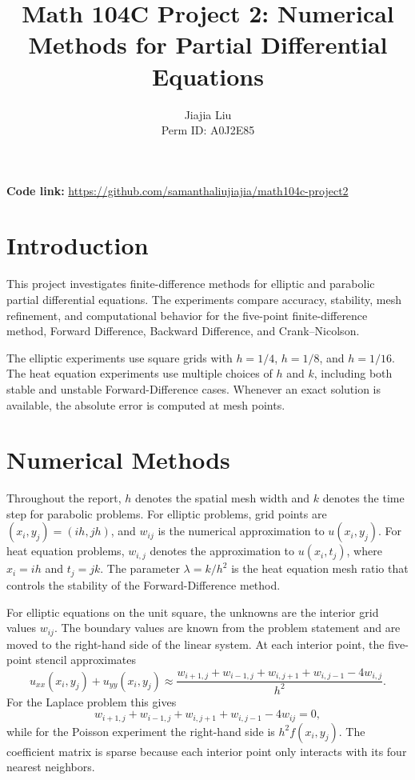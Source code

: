 \documentclass[11pt]{article}
\title{Math 104C Project 2: Numerical Methods for Partial Differential Equations}
\author{Jiajia Liu \\ Perm ID: A0J2E85}
\date{}
\begin{document}
\maketitle

\textbf{Code link:} \href{https://github.com/samanthaliujiajia/math104c-project2}{https://github.com/samanthaliujiajia/math104c-project2}

\section{Introduction}

This project investigates finite-difference methods for elliptic and parabolic
partial differential equations. The experiments compare accuracy, stability,
mesh refinement, and computational behavior for the five-point finite-difference
method, Forward Difference, Backward Difference, and Crank--Nicolson.

The elliptic experiments use square grids with \(h=1/4\), \(h=1/8\), and
\(h=1/16\). The heat equation experiments use multiple choices of \(h\) and
\(k\), including both stable and unstable Forward-Difference cases. Whenever an
exact solution is available, the absolute error is computed at mesh points.

\section{Numerical Methods}

Throughout the report, \(h\) denotes the spatial mesh width and \(k\) denotes
the time step for parabolic problems. For elliptic problems, grid points are
\((x_i,y_j)=(ih,jh)\), and \(w_{ij}\) is the numerical approximation to
\(u(x_i,y_j)\). For heat equation problems, \(w_{i,j}\) denotes the
approximation to \(u(x_i,t_j)\), where \(x_i=ih\) and \(t_j=jk\). The parameter
\(\lambda=k/h^2\) is the heat equation mesh ratio that controls the stability
of the Forward-Difference method.

For elliptic equations on the unit square, the unknowns are the interior grid
values \(w_{ij}\). The boundary values are known from the problem statement and
are moved to the right-hand side of the linear system. At each interior point,
the five-point stencil approximates
\[
  u_{xx}(x_i,y_j)+u_{yy}(x_i,y_j)
  \approx
  \frac{w_{i+1,j}+w_{i-1,j}+w_{i,j+1}+w_{i,j-1}-4w_{i,j}}{h^2}.
\]
For the Laplace problem this gives
\[
  w_{i+1,j}+w_{i-1,j}+w_{i,j+1}+w_{i,j-1}-4w_{ij}=0,
\]
while for the Poisson experiment the right-hand side is \(h^2 f(x_i,y_j)\).
The coefficient matrix is sparse because each interior point only interacts
with its four nearest neighbors.
\end{document}
